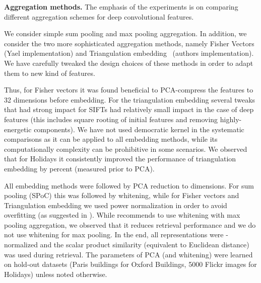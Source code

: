 {\bf Aggregation methods.} The emphasis of the experiments is on comparing different aggregation schemes for deep convolutional features.

We consider simple sum pooling and max pooling aggregation. In addition, we consider the two more sophisticated aggregation methods, namely Fisher Vectors~\cite{Perronnin10} (Yael \cite{Yael} implementation) and Triangulation embedding~\cite{Jegou14} (authors implementation). We have carefully tweaked the design choices of these methods in order to adapt them to new kind of features. 

Thus, for Fisher vectors it was found beneficial to PCA-compress the features to 32 dimensions before embedding. For the triangulation embedding several tweaks that had strong impact for SIFTs had relatively small impact in the case of deep features (this includes square rooting of initial features and removing highly-energetic components). We have not used democratic kernel \cite{Jegou14} in the systematic comparisons as it can be applied to all embedding methods, while its computationally complexity can be prohibitive in some scenarios. We observed that for Holidays it consistently improved the performance of triangulation embedding by  percent (measured prior to PCA).

All embedding methods were followed by PCA reduction to  dimensions. For sum pooling (SPoC) this was followed by whitening, while for Fisher vectors and Triangulation embedding we used power normalization in order to avoid overfitting (as suggested in \cite{Jegou14}). While \cite{Azizpour14} recommends to use whitening with max pooling aggregation, we observed that it reduces retrieval performance and we do not use whitening for max pooling. In the end, all representations were -normalized and the scalar product similarity (equivalent to Euclidean distance) was used during retrieval. The parameters of PCA (and whitening) were learned on hold-out datasets (Paris buildings for Oxford Buildings, 5000 Flickr images for Holidays) unless noted otherwise.

